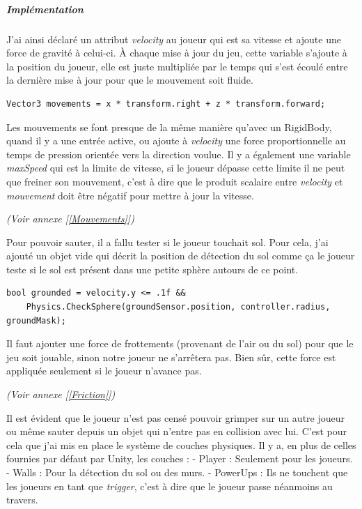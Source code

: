 \documentclass{article}
\begin{document}
\subparagraph{Implémentation}


J'ai ainsi déclaré un attribut \emph{velocity} au joueur qui est sa vitesse et ajoute une force de gravité à celui-ci. À chaque mise à jour du jeu, cette variable s'ajoute à la position du joueur, elle est juste multipliée par le temps qui s'est écoulé entre la dernière mise à jour pour que le mouvement soit fluide.

\begin{lstlisting}
Vector3 movements = x * transform.right + z * transform.forward;
\end{lstlisting}

Les mouvements se font presque de la même manière qu'avec un RigidBody, quand il y a une entrée active, ou ajoute à \emph{velocity} une force proportionnelle au temps de pression orientée vers la direction voulue. Il y a également une variable \emph{maxSpeed} qui est la limite de vitesse, si le joueur dépasse cette limite il ne peut que freiner son mouvement, c'est à dire que le produit scalaire entre \emph{velocity} et \emph{mouvement} doit être négatif pour mettre à jour la vitesse.

\emph{(Voir annexe [\ref{Mouvements}])}

Pour pouvoir sauter, il a fallu tester si le joueur touchait sol. Pour cela, j'ai ajouté un objet vide qui décrit la position de détection du sol comme ça le joueur teste si le sol est présent dans une petite sphère autours de ce point.

\begin{lstlisting}
bool grounded = velocity.y <= .1f &&
	Physics.CheckSphere(groundSensor.position, controller.radius, groundMask);
\end{lstlisting}

Il faut ajouter une force de frottements (provenant de l'air ou du sol) pour que le jeu soit jouable, sinon notre joueur ne s'arrêtera pas. Bien sûr, cette force est appliquée seulement si le joueur n'avance pas.

\emph{(Voir annexe [\ref{Friction}])}

Il est évident que le joueur n'est pas censé pouvoir grimper sur un autre joueur ou même sauter depuis un objet qui n'entre pas en collision avec lui. C'est pour cela que j'ai mis en place le système de couches physiques. Il y a, en plus de celles fournies par défaut par Unity, les couches :
- Player : Seulement pour les joueurs.
- Walls : Pour la détection du sol ou des murs.
- PowerUps : Ils ne touchent que les joueurs en tant que \emph{trigger}, c'est à dire que le joueur passe néanmoins au travers.
\end{document}
